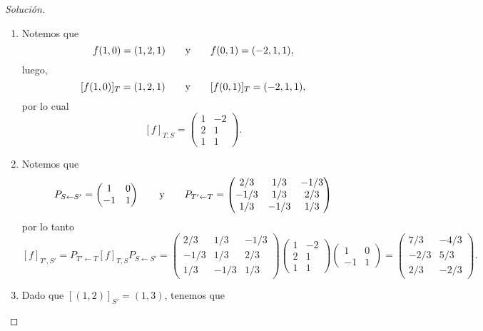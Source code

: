 \documentclass[a4,11pt]{aleph-notas}
\begin{document}
\begin{proof}[Solución]\hspace{0pt}
    \begin{enumerate}
    \item Notemos que 
    \[
        f(1, 0) = (1, 2, 1)
        \qquad\text{y}\qquad
        f(0, 1) = (-2, 1, 1),
    \]
    luego, 
    \[
        [f(1, 0)]_{T} = (1, 2, 1)
        \qquad\text{y}\qquad
        [f(0, 1)]_{T} = (-2, 1, 1),
    \]
    por lo cual
    \[
        [f]_{T,S} = 
        \begin{pmatrix}
            1 & -2\\
            2 & 1\\
            1 & 1
        \end{pmatrix}.
    \]
    \item Notemos que 
    \[
        P_{S \leftarrow S'} = 
        \begin{pmatrix}
            1 & 0\\
            -1 & 1
        \end{pmatrix}
        \qquad\text{y}\qquad
        P_{T' \leftarrow T} = 
        \begin{pmatrix}
            2/3 & 1/3 & -1/3\\
            -1/3 & 1/3 & 2/3\\
            1/3 & -1/3 & 1/3
        \end{pmatrix}
    \]
    por lo tanto
    \[
        [f]_{T',S'} = P_{T'\leftarrow T} [f]_{T,S} P_{S\leftarrow S'} = \begin{pmatrix}
            2/3 & 1/3 & -1/3\\
            -1/3 & 1/3 & 2/3\\
            1/3 & -1/3 & 1/3
        \end{pmatrix}
        \begin{pmatrix}
            1 & -2\\
            2 & 1\\
            1 & 1
        \end{pmatrix}
        \begin{pmatrix}
            1 & 0\\
            -1 & 1
        \end{pmatrix}
        = 
        \begin{pmatrix}
            7/3 & -4/3\\
            -2/3 & 5/3\\
            2/3 & -2/3
        \end{pmatrix}.
    \]
    \item Dado que $[(1, 2)]_{S'} = (1, 3)$, tenemos que

\end{enumerate}
\end{proof}
\end{document}

